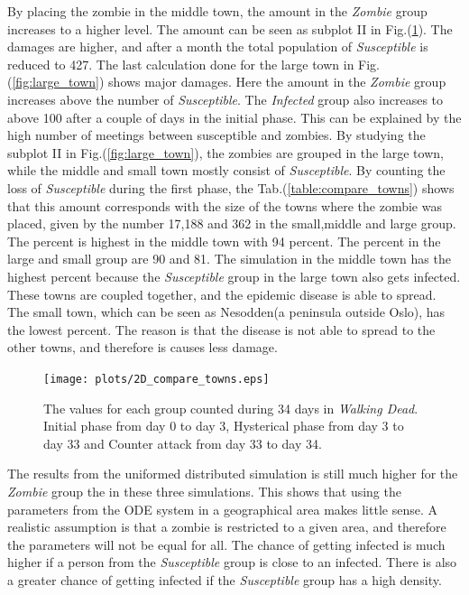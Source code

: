 \documentclass[%
twoside,                 %
final,                   %
10pt]{article}
\begin{document}
By placing the zombie in the middle town, the amount in the \emph{Zombie} group increases to a higher level. The amount can be seen as subplot II in Fig.(\ref{fig:compare_towns}). The damages are higher, and after a month the total population of \emph{Susceptible} is reduced to 427. The last calculation done for the large town in Fig.(\ref{fig:large_town}) shows major damages. Here the amount in the \emph{Zombie} group increases above the number of \emph{Susceptible}. The \emph{Infected} group also increases to above 100 after a couple of days in the initial phase. This can be explained by the high number of meetings between susceptible and zombies. By studying the subplot II in Fig.(\ref{fig:large_town}), the zombies are grouped in the large town, while the middle and small town mostly consist of \emph{Susceptible}. By counting the loss of \emph{Susceptible} during the first phase, the Tab.(\ref{table:compare_towns}) shows that this amount corresponds with the size of the towns where the zombie was placed, given by the number 17,188 and 362 in the small,middle and large group. The percent is highest in the middle town with 94 percent. The percent in the large and small group are 90 and 81.  The simulation in the middle town has the highest percent because the \emph{Susceptible} group in the large town also gets infected. These towns are coupled together, and the epidemic disease is able to spread. The small town, which can be seen as Nesodden(a peninsula outside Oslo), has the lowest percent. The reason is that the disease is not able to spread to the other towns, and therefore is causes less damage.  


\begin{figure}[ht]
  \centerline{\texttt{[image: plots/2D\_compare\_towns.eps]}}
  \caption{
  \label{fig:compare_towns} The values for each group counted during 34 days in \emph{Walking Dead}. Initial phase from day 0 to day 3, Hysterical phase from day 3 to day 33 and Counter attack from day 33 to day 34.
  }
\end{figure}




\vspace{3mm}




\vspace{3mm}


The results from the uniformed distributed simulation is still much higher for the \emph{Zombie} group the in these three simulations. This shows that using the parameters from the ODE system in a geographical area makes little sense. A realistic assumption is that a zombie is restricted to a given area, and therefore the parameters will not be equal for all. The chance of getting infected is much higher if a person from the  \emph{Susceptible} group is close to an infected. There is also a greater chance of getting infected if the \emph{Susceptible} group has a high density. 
\end{document}
